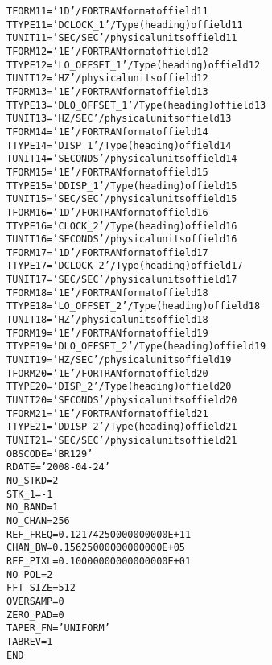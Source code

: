 \documentclass[twoside]{article}
\begin{document}
\begin{alltt}
TFORM11 = '1D      '           / FORTRAN format of field 11
TTYPE11 = 'DCLOCK_1        '   / Type (heading) of field 11
TUNIT11 = 'SEC/SEC '           / physical units of field 11
TFORM12 = '1E      '           / FORTRAN format of field 12
TTYPE12 = 'LO_OFFSET_1     '   / Type (heading) of field 12
TUNIT12 = 'HZ      '           / physical units of field 12
TFORM13 = '1E      '           / FORTRAN format of field 13
TTYPE13 = 'DLO_OFFSET_1    '   / Type (heading) of field 13
TUNIT13 = 'HZ/SEC  '           / physical units of field 13
TFORM14 = '1E      '           / FORTRAN format of field 14
TTYPE14 = 'DISP_1          '   / Type (heading) of field 14
TUNIT14 = 'SECONDS '           / physical units of field 14
TFORM15 = '1E      '           / FORTRAN format of field 15
TTYPE15 = 'DDISP_1         '   / Type (heading) of field 15
TUNIT15 = 'SEC/SEC '           / physical units of field 15
TFORM16 = '1D      '           / FORTRAN format of field 16
TTYPE16 = 'CLOCK_2         '   / Type (heading) of field 16
TUNIT16 = 'SECONDS '           / physical units of field 16
TFORM17 = '1D      '           / FORTRAN format of field 17
TTYPE17 = 'DCLOCK_2        '   / Type (heading) of field 17
TUNIT17 = 'SEC/SEC '           / physical units of field 17
TFORM18 = '1E      '           / FORTRAN format of field 18
TTYPE18 = 'LO_OFFSET_2     '   / Type (heading) of field 18
TUNIT18 = 'HZ      '           / physical units of field 18
TFORM19 = '1E      '           / FORTRAN format of field 19
TTYPE19 = 'DLO_OFFSET_2    '   / Type (heading) of field 19
TUNIT19 = 'HZ/SEC  '           / physical units of field 19
TFORM20 = '1E      '           / FORTRAN format of field 20
TTYPE20 = 'DISP_2          '   / Type (heading) of field 20
TUNIT20 = 'SECONDS '           / physical units of field 20
TFORM21 = '1E      '           / FORTRAN format of field 21
TTYPE21 = 'DDISP_2         '   / Type (heading) of field 21
TUNIT21 = 'SEC/SEC '           / physical units of field 21
OBSCODE = 'BR129   '
RDATE   = '2008-04-24'
NO_STKD =            2
STK_1   =           -1
NO_BAND =            1
NO_CHAN =          256
REF_FREQ=   0.12174250000000000E+11
CHAN_BW =   0.15625000000000000E+05
REF_PIXL=   0.10000000000000000E+01
NO_POL  =            2
FFT_SIZE=          512
OVERSAMP=            0
ZERO_PAD=            0
TAPER_FN= 'UNIFORM '
TABREV  =            1
END
\end{alltt}
\end{document}
